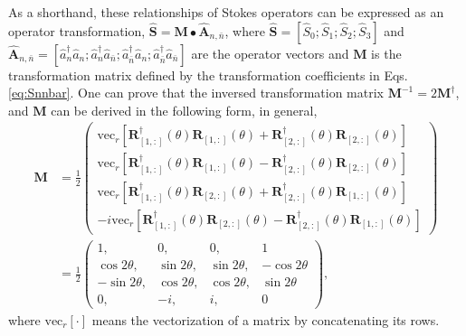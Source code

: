 \documentclass[preprint,aps,pra,onecolumn,superscriptaddress]{revtex4-1} %
\begin{document}
\begin{appendix}
As a shorthand, these relationships of Stokes operators can be expressed as an operator transformation, $ \hat{\mathbf{S}}=\mathbf{M}\bullet\hat{\mathbf{A}}_{n,\bar{n}} $, where $ \hat{\mathbf{S}}=[\hat{S}_0;\hat{S}_1;\hat{S}_2;\hat{S}_3] $ and $ \hat{\mathbf{A}}_{n,\bar{n}}=[\hat{a}_n^\dagger\hat{a}_n;\hat{a}_n^\dagger\hat{a}_{\bar{n}};\hat{a}_{\bar{n}}^\dagger\hat{a}_n;\hat{a}_{\bar{n}}^\dagger\hat{a}_{\bar{n}}] $ are the operator vectors and $ \mathbf{M} $ is the transformation matrix defined by the transformation coefficients in Eqs.\eqref{eq:Snnbar}.
One can prove that the inversed transformation matrix $ \mathbf{M}^{-1}=2\mathbf{M}^\dagger $, and $ \mathbf{M} $ can be derived in the following form, in general,
\begin{align}
\mathbf{M} &=\frac{1}{2}\left(\!\begin{array}{c}
\mathrm{vec}_r\left[\mathbf{R}_{[1,:]}^\dagger(\theta)\mathbf{R}_{[1,:]}(\theta) + \mathbf{R}_{[2,:]}^\dagger(\theta)\mathbf{R}_{[2,:]}(\theta) \right]\\
\mathrm{vec}_r\left[\mathbf{R}_{[1,:]}^\dagger(\theta)\mathbf{R}_{[1,:]}(\theta) - \mathbf{R}_{[2,:]}^\dagger(\theta)\mathbf{R}_{[2,:]}(\theta) \right]\\
\mathrm{vec}_r\left[\mathbf{R}_{[1,:]}^\dagger(\theta)\mathbf{R}_{[2,:]}(\theta) + \mathbf{R}_{[2,:]}^\dagger(\theta)\mathbf{R}_{[1,:]}(\theta) \right]\\
-i\mathrm{vec}_r\left[\mathbf{R}_{[1,:]}^\dagger(\theta)\mathbf{R}_{[2,:]}(\theta) - \mathbf{R}_{[2,:]}^\dagger(\theta)\mathbf{R}_{[1,:]}(\theta) \right]
 \end{array} \!\right)\\
&= \frac{1}{2}\left(\!\begin{array}{cccc} 1,&0,&0,& 1\\
\cos 2\theta,&\sin 2\theta, & \sin 2\theta, & -\cos 2\theta\\
-\sin 2\theta, & \cos 2\theta, & \cos 2\theta, & \sin 2\theta\\
0,&-i,& i,& 0\end{array}\!\right),
\end{align}
where $ \mathrm{vec}_r[\cdot] $ means the vectorization of a matrix by concatenating its rows. 



\end{appendix}
\end{document}
